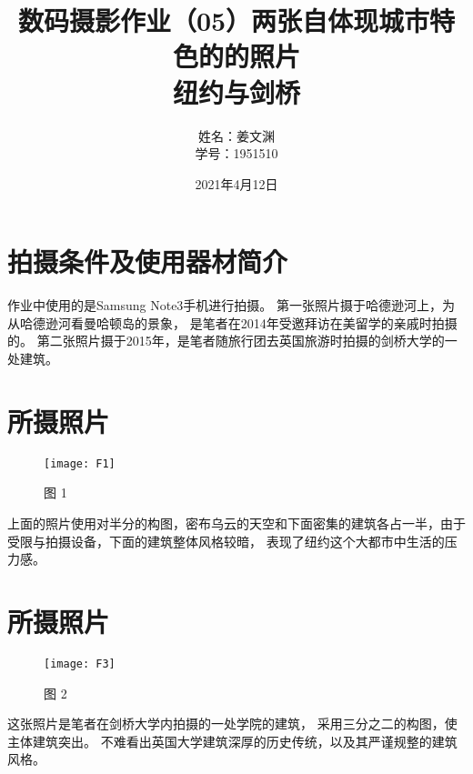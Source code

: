 \documentclass[cn,black,9pt,normal]{elegantnote}
\title{数码摄影作业（05）两张自体现城市特色的的照片\\\small{纽约与剑桥}}
\author{姓名：姜文渊\\学号：1951510}
\date{2021年4月12日}
\begin{document}
\maketitle


\section*{拍摄条件及使用器材简介}

作业中使用的是Samsung Note3手机进行拍摄。
第一张照片摄于哈德逊河上，为从哈德逊河看曼哈顿岛的景象，
是笔者在2014年受邀拜访在美留学的亲戚时拍摄的。
第二张照片摄于2015年，是笔者随旅行团去英国旅游时拍摄的剑桥大学的一处建筑。

\section{所摄照片}
\begin{figure}[H]
    \centering
    \texttt{[image: F1]}
    \caption{图 1}
    \label{F-01}
\end{figure}

上面的照片使用对半分的构图，密布乌云的天空和下面密集的建筑各占一半，由于受限与拍摄设备，下面的建筑整体风格较暗，
表现了纽约这个大都市中生活的压力感。

\section{所摄照片}
\begin{figure}[H]
    \centering
    \texttt{[image: F3]}
    \caption{图 2}
    \label{F-02}
\end{figure}

这张照片是笔者在剑桥大学内拍摄的一处学院的建筑，
采用三分之二的构图，使主体建筑突出。
不难看出英国大学建筑深厚的历史传统，以及其严谨规整的建筑风格。

\end{document}
